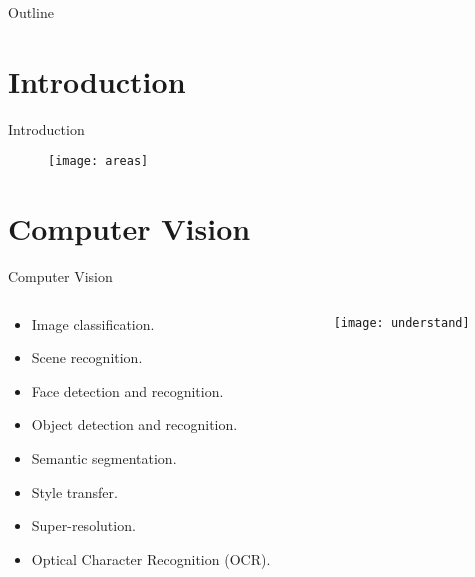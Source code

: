 


\subtitle{Applications}



\frame{\titlepage}

\begin{frame}{Outline}
\tableofcontents
\end{frame}

\section{Introduction}

\begin{frame}{Introduction}
\begin{figure}[!]
\centering
\texttt{[image: areas]}
\end{figure}
\end{frame}

\section{Computer Vision}

\begin{frame}{Computer Vision}
\begin{columns}[t]
\begin{column}{.4\textwidth}
\begin{itemize}
\item Image classification.
\item Scene recognition.
\item Face detection and recognition.
\item Object detection and recognition.
\item Semantic segmentation.
\item Style transfer.
\item Super-resolution.
\item Optical Character Recognition (OCR).
\end{itemize}
\end{column}
\begin{column}{.6\textwidth}
\begin{figure}[!]
\centering
\texttt{[image: understand]}
\end{figure}
\end{column}
\end{columns}
\end{frame}


